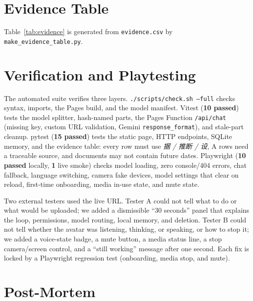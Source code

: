 \documentclass[12pt,a4paper]{article}
\renewcommand{\footnotesize}{\fontsize{10}{12}\selectfont}
\begin{document}
\section{Evidence Table}

Table~\ref{tab:evidence} is generated from \texttt{evidence.csv} by
\texttt{make\_evidence\_table.py}.

\begin{table}[htbp]
  \centering
  \footnotesize
  \singlespacing
  \renewcommand{\arraystretch}{1.25}
  
  \caption{Claims and design elements with locators, evidence tiers
  (\emph{据} documented, \emph{推断} inferred, \emph{设} invented), and limits.}
  \label{tab:evidence}
\end{table}

\section{Verification and Playtesting}

The automated suite verifies three layers. \texttt{./scripts/check.sh --full}
checks syntax, imports, the Pages build, and the model manifest. Vitest
(\textbf{10 passed}) tests the model splitter, hash-named parts, the Pages
Function \texttt{/api/chat} (missing key, custom URL validation, Gemini
\texttt{response\_format}), and stale-part cleanup. pytest (\textbf{15 passed})
tests the static page, HTTP endpoints, SQLite memory, and the evidence table:
every row must use \emph{据 / 推断 / 设}, A rows need a traceable source, and
documents may not contain future dates. Playwright (\textbf{10 passed} locally,
\textbf{1} live smoke) checks model loading, zero console/404 errors, chat
fallback, language switching, camera fake devices, model settings that clear on
reload, first-time onboarding, media in-use state, and mute state.

Two external testers used the live URL. Tester A could not tell what to do or
what would be uploaded; we added a dismissible ``30 seconds'' panel that explains
the loop, permissions, model routing, local memory, and deletion. Tester B could
not tell whether the avatar was listening, thinking, or speaking, or how to stop
it; we added a voice-state badge, a mute button, a media status line, a stop
camera/screen control, and a ``still working'' message after one second. Each fix
is locked by a Playwright regression test (onboarding, media stop, and mute).

\section{Post-Mortem}
\end{document}
